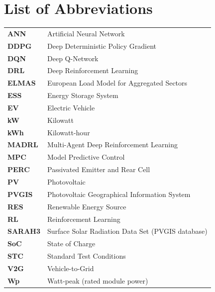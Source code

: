 
\chapter*{List of Abbreviations}

\begin{tabular}{@{}>{\bfseries}p{2.8cm}p{11.2cm}@{}}
ANN & Artificial Neural Network \\
DDPG & Deep Deterministic Policy Gradient \\
DQN & Deep Q-Network \\
DRL & Deep Reinforcement Learning \\
ELMAS & European Load Model for Aggregated Sectors \\
ESS & Energy Storage System \\
EV & Electric Vehicle \\
kW & Kilowatt \\
kWh & Kilowatt-hour \\
MADRL & Multi-Agent Deep Reinforcement Learning \\
MPC & Model Predictive Control \\
PERC & Passivated Emitter and Rear Cell \\
PV & Photovoltaic \\
PVGIS & Photovoltaic Geographical Information System \\
RES & Renewable Energy Source \\
RL & Reinforcement Learning \\
SARAH3 & Surface Solar Radiation Data Set (PVGIS database) \\
SoC & State of Charge \\
STC & Standard Test Conditions \\
V2G & Vehicle-to-Grid \\
Wp & Watt-peak (rated module power) \\
\end{tabular}

\newpage
